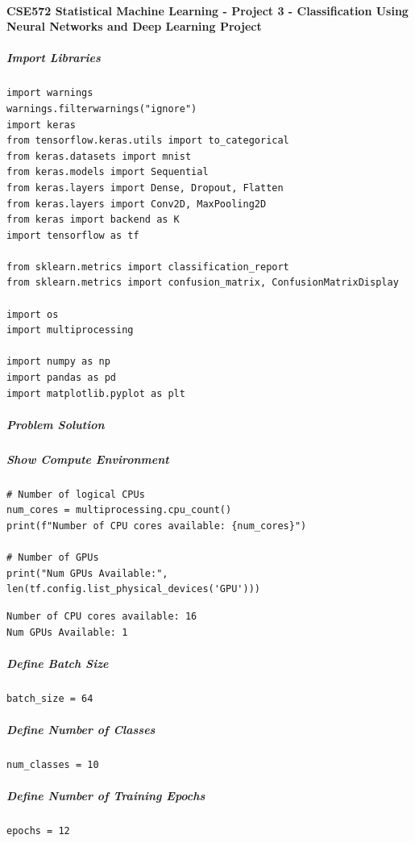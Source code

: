 \paragraph{CSE572 Statistical Machine Learning - Project 3 - Classification Using Neural Networks and Deep Learning Project}

\subparagraph{Import Libraries}

\begin{verbatim}
import warnings
warnings.filterwarnings("ignore")
import keras
from tensorflow.keras.utils import to_categorical
from keras.datasets import mnist
from keras.models import Sequential
from keras.layers import Dense, Dropout, Flatten
from keras.layers import Conv2D, MaxPooling2D
from keras import backend as K
import tensorflow as tf

from sklearn.metrics import classification_report
from sklearn.metrics import confusion_matrix, ConfusionMatrixDisplay

import os
import multiprocessing

import numpy as np
import pandas as pd
import matplotlib.pyplot as plt
\end{verbatim}

\subparagraph{Problem Solution}

\subparagraph{Show Compute Environment}

\begin{verbatim}
# Number of logical CPUs
num_cores = multiprocessing.cpu_count()
print(f"Number of CPU cores available: {num_cores}")

# Number of GPUs
print("Num GPUs Available:", len(tf.config.list_physical_devices('GPU')))
\end{verbatim}

\begin{verbatim}
Number of CPU cores available: 16
Num GPUs Available: 1
\end{verbatim}

\subparagraph{Define Batch Size}

\begin{verbatim}
batch_size = 64
\end{verbatim}

\subparagraph{Define Number of Classes}

\begin{verbatim}
num_classes = 10
\end{verbatim}

\subparagraph{Define Number of Training Epochs}

\begin{verbatim}
epochs = 12
\end{verbatim}

